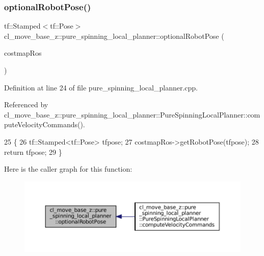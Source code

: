 \subsubsection{\texorpdfstring{optional\+Robot\+Pose()}{optionalRobotPose()}}
{\footnotesize\ttfamily tf\+::\+Stamped$<$tf\+::\+Pose$>$ cl\+\_\+move\+\_\+base\+\_\+z\+::pure\+\_\+spinning\+\_\+local\+\_\+planner\+::optional\+Robot\+Pose (\begin{DoxyParamCaption}\item[{costmap\+\_\+2d\+::\+Costmap2\+D\+R\+OS $\ast$}]{costmap\+Ros }\end{DoxyParamCaption})}



Definition at line 24 of file pure\+\_\+spinning\+\_\+local\+\_\+planner.\+cpp.



Referenced by cl\+\_\+move\+\_\+base\+\_\+z\+::pure\+\_\+spinning\+\_\+local\+\_\+planner\+::\+Pure\+Spinning\+Local\+Planner\+::compute\+Velocity\+Commands().


\begin{DoxyCode}
25 \{
26   tf::Stamped<tf::Pose> tfpose;
27   costmapRos->getRobotPose(tfpose);
28   \textcolor{keywordflow}{return} tfpose;
29 \}
\end{DoxyCode}
Here is the caller graph for this function\+:
\nopagebreak
\begin{figure}[H]
\begin{center}
\leavevmode
\includegraphics[width=350pt]{namespacecl__move__base__z_1_1pure__spinning__local__planner_a6ae763fceb009e0c477171fefe74b4fc_icgraph}
\end{center}
\end{figure}
\mbox{\label{namespacecl__move__base__z_1_1pure__spinning__local__planner_ab6a498d3454059055f0aebf49c7b82cf}} 
